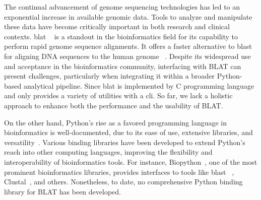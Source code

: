 

The continual advancement of genome sequencing technologies has led to an exponential increase in available genomic data.
Tools to analyze and manipulate these data have become critically important in both research and clinical contexts.
\gls{blat} ~\citep{kent2002blat} is a standout in the bioinformatics field for its capability to perform rapid genome sequence alignments.
It offers a faster alternative to \gls{blast}~\citep{altschul1990basic}  for aligning DNA sequences to the human genome ~\citep{kent2002blat}.
Despite its widespread use and acceptance in the bioinformatics community, interfacing with BLAT can present challenges, particularly when integrating it within a broader Python-based analytical pipeline.
Since \gls{blat} is implemented by C programming language and only provides a variety of utilities with a \gls{cli}.
So far, we lack a holistic approach to enhance both the performance and the usability of BLAT.

On the other hand, Python's rise as a favored programming language in bioinformatics is well-documented, due to its ease of use, extensive libraries, and versatility~\citep{perkel2015programming}.
Various binding libraries have been developed to extend Python's reach into other computing languages, improving the flexibility and interoperability of bioinformatics tools.
For instance, Biopython~\citep{cock2009biopython}, one of the most prominent bioinformatics libraries, provides interfaces to tools like \gls{blast} ~\citep{altschul1990basic}, Clustal~\citep{higgins1988clustal}, and others.
Nonetheless, to date, no comprehensive Python binding library for BLAT has been developed.

